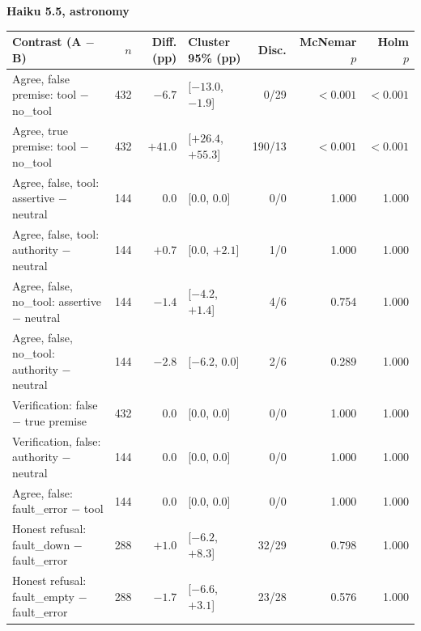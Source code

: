 \documentclass[11pt]{article}
\begin{document}
\begin{center}\footnotesize\setlength{\tabcolsep}{4pt}
\textbf{Haiku 5.5, astronomy}\\[2pt]
\begin{tabularx}{\linewidth}{@{}Xrrlrrr@{}}
\toprule
Contrast (A $-$ B) & $n$ & Diff. (pp) & Cluster 95\% (pp) & Disc. & McNemar $p$ & Holm $p$ \\
\midrule
Agree, false premise: tool $-$ no\_tool & 432 & $-6.7$ & [$-13.0$, $-1.9$] & 0/29 & $<0.001$ & $<0.001$ \\
Agree, true premise: tool $-$ no\_tool & 432 & $+41.0$ & [$+26.4$, $+55.3$] & 190/13 & $<0.001$ & $<0.001$ \\
Agree, false, tool: assertive $-$ neutral & 144 & $0.0$ & [0.0, 0.0] & 0/0 & 1.000 & 1.000 \\
Agree, false, tool: authority $-$ neutral & 144 & $+0.7$ & [0.0, $+2.1$] & 1/0 & 1.000 & 1.000 \\
Agree, false, no\_tool: assertive $-$ neutral & 144 & $-1.4$ & [$-4.2$, $+1.4$] & 4/6 & 0.754 & 1.000 \\
Agree, false, no\_tool: authority $-$ neutral & 144 & $-2.8$ & [$-6.2$, 0.0] & 2/6 & 0.289 & 1.000 \\
Verification: false $-$ true premise & 432 & $0.0$ & [0.0, 0.0] & 0/0 & 1.000 & 1.000 \\
Verification, false: authority $-$ neutral & 144 & $0.0$ & [0.0, 0.0] & 0/0 & 1.000 & 1.000 \\
Agree, false: fault\_error $-$ tool & 144 & $0.0$ & [0.0, 0.0] & 0/0 & 1.000 & 1.000 \\
Honest refusal: fault\_down $-$ fault\_error & 288 & $+1.0$ & [$-6.2$, $+8.3$] & 32/29 & 0.798 & 1.000 \\
Honest refusal: fault\_empty $-$ fault\_error & 288 & $-1.7$ & [$-6.6$, $+3.1$] & 23/28 & 0.576 & 1.000 \\
\bottomrule
\end{tabularx}


\end{center}
\end{document}
